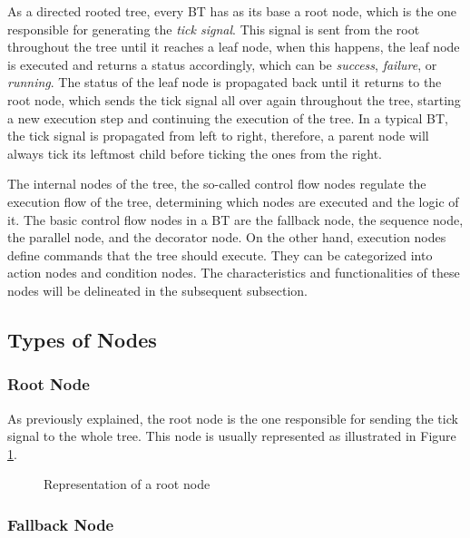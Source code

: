 As a directed rooted tree, every BT has as its base a root node, which is the one responsible for generating the \textit{tick signal}. This signal is sent from the root throughout the tree until it reaches a leaf node, when this happens, the leaf node is executed and returns a status accordingly, which can be \textit{success}, \textit{failure}, or \textit{running}. The status of the leaf node is propagated back until it returns to the root node, which sends the tick signal all over again throughout the tree, starting a new execution step and continuing the execution of the tree. In a typical BT, the tick signal is propagated from left to right, therefore, a parent node will always tick its leftmost child before ticking the ones from the right.

The internal nodes of the tree, the so-called control flow nodes regulate the execution flow of the tree, determining which nodes are executed and the logic of it. The basic control flow nodes in a BT are the fallback node, the sequence node, the parallel node, and the decorator node. On the other hand, execution nodes define commands that the tree should execute. They can be categorized into action nodes and condition nodes. The characteristics and functionalities of these nodes will be delineated in the subsequent subsection.

\subsection{Types of Nodes}

\subsubsection{Root Node}

As previously explained, the root node is the one responsible for sending the tick signal to the whole tree. This node is usually represented as illustrated in Figure \ref{fig:background_root_node}.

\begin{figure}[!h]
    \centering
    \scalebox{.9} {
        \begin{forest}
        \end{forest}
    }
    \caption{Representation of a root node}
    \label{fig:background_root_node}
\end{figure}

\subsubsection{Fallback Node}

